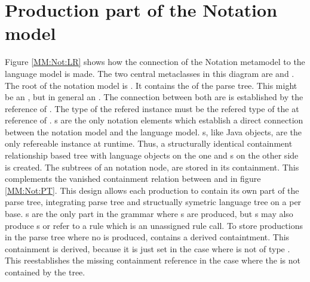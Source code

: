 \section{Production part of the Notation model} \label{sec:MM:Not:Prod}
Figure \ref{MM:Not:LR} shows how the connection of the Notation metamodel to the language model is made. The two central metaclasses in this diagram are  and . The root of the notation model is . It contains the  of the parse tree. This might be an , but in general an . The connection between both are is established by the reference  of .  The type of the refered instance must be the refered type of the  at  reference of . s are the only notation elements which establish a direct connection between the notation model and the language model. s, like Java objects, are the only refereable instance at runtime. Thus, a structurally identical containment relationship based tree with language objects on the one and s on the other side is created. The subtrees of an notation node,  are stored in its  containment. This complements the vanished containment relation between  and  in figure \ref{MM:Not:PT}. This design allows each  production to contain its own part of the parse tree, integrating parse tree and structually symetric language tree on a per  base. s are the only part in the grammar where s are produced, but s may also produce s or refer to a rule which is an unassigned rule call. To store productions in the parse tree where no  is produced,  contains a derived  containtment. This containment is derived, because it is just set in the case where  is not of type . This reestablishes the missing containment reference in the case where the  is not contained by the  tree. \\
